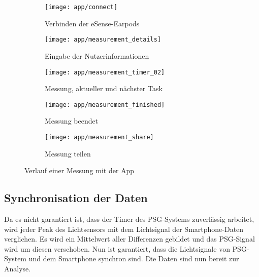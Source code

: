 \begin{figure}[ht]
  \centering
  \begin{subfigure}{.25\textwidth}
    \texttt{[image: app/connect]}
    \caption{Verbinden der eSense-Earpods}
    \label{implementation:app:screenshots:connect_bluetooth}
  \end{subfigure}
  \begin{subfigure}{.25\textwidth}
    \texttt{[image: app/measurement\_details]}
    \caption{Eingabe der Nutzerinformationen}
    \label{implementation:app:screenshots:user_studies_information}
  \end{subfigure}
  \begin{subfigure}{.25\textwidth}
    \texttt{[image: app/measurement\_timer\_02]}
    \caption{Messung, aktueller und nächster Task}
    \label{implementation:app:screenshots:measurement_started}
  \end{subfigure}
  \begin{subfigure}{.25\textwidth}
    \texttt{[image: app/measurement\_finished]}
    \caption{Messung beendet}
    \label{implementation:app:screenshots:sampling_stopped}
  \end{subfigure}
  \begin{subfigure}{.25\textwidth}
    \texttt{[image: app/measurement\_share]}
    \caption{Messung teilen}
    \label{implementation:app:screenshots:share}
  \end{subfigure}
  \caption{Verlauf einer Messung mit der App}
  \label{implementation:app:screenshots}
\end{figure}

\subsection{Synchronisation der Daten}
\label{ch:Implementierung:data_sync}
Da es nicht garantiert ist, dass der Timer des PSG-Systems zuverlässig arbeitet, wird jeder Peak des Lichtsensors mit dem Lichtsignal der Smartphone-Daten verglichen.
Es wird ein Mittelwert aller Differenzen gebildet und das PSG-Signal wird um diesen verschoben.
Nun ist garantiert, dass die Lichtsignale von PSG-System und dem Smartphone synchron sind. Die Daten sind nun bereit zur Analyse.

